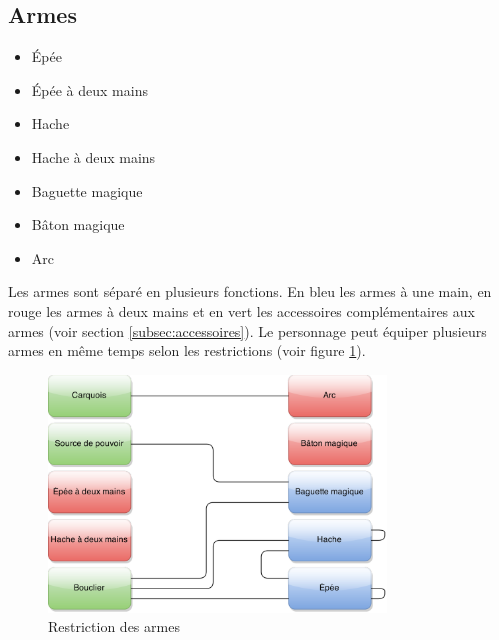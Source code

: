 \documentclass[11pt, a4paper, oneside]{report}
\begin{document}
\subsection{Armes}
\begin{multicols}{2}
\begin{itemize}
    \item Épée
    \item Épée à deux mains
    \item Hache
    \item Hache à deux mains
    \item Baguette magique
    \item Bâton magique
    \item Arc
\end{itemize}
\end{multicols}
Les armes sont séparé en plusieurs fonctions. En bleu les armes à une main, en rouge les armes à deux mains et en vert les accessoires complémentaires aux armes (voir section \ref{subsec:accessoires}).
Le personnage peut équiper plusieurs armes en même temps selon les restrictions (voir figure \ref{fig:EquipmentRestrictions}).
\begin{figure}[ht]
	\begin{center}
	\includegraphics[width=0.8\textwidth]{EquipmentRestrictions}
	\caption{Restriction des armes}
	\label{fig:EquipmentRestrictions}
	\end{center}
\end{figure}
\newpage
\end{document}
